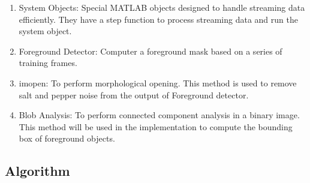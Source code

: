\documentclass{article}
\begin{document}
	\begin{enumerate}
		\item System Objects: Special MATLAB objects designed to handle streaming data efficiently. They have a step function to process streaming data and run the system object.
		
		\item Foreground Detector: Computer a foreground mask based on a series of training frames.
		
		\item imopen: To perform morphological opening. This method is used to remove salt and pepper noise from the output of Foreground detector.
	
		\item Blob Analysis: To perform connected component analysis in a binary image. This method will be used in the implementation to compute the bounding box of foreground objects.
		
	\end{enumerate}

	\subsection{Algorithm}
\end{document}
